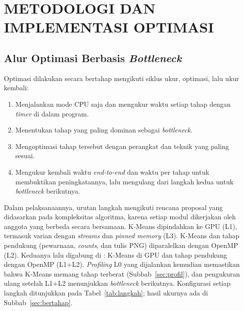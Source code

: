 \chapter{METODOLOGI DAN IMPLEMENTASI OPTIMASI}

\section{Alur Optimasi Berbasis \emph{Bottleneck}}
\label{sec:alur}
Optimasi dilakukan secara bertahap mengikuti siklus ukur, optimasi, lalu ukur kembali:
\begin{enumerate}
    \item Menjalankan mode CPU saja dan mengukur waktu setiap tahap dengan \emph{timer} di dalam program.
    \item Menentukan tahap yang paling dominan sebagai \emph{bottleneck}.
    \item Mengoptimasi tahap tersebut dengan perangkat dan teknik yang paling sesuai.
    \item Mengukur kembali waktu \emph{end-to-end} dan waktu per tahap untuk membuktikan peningkatannya, lalu mengulang dari langkah kedua untuk \emph{bottleneck} berikutnya.
\end{enumerate}

Dalam pelaksanaannya, urutan langkah mengikuti rencana proposal yang didasarkan pada kompleksitas algoritma, karena setiap modul dikerjakan oleh anggota yang berbeda secara bersamaan. K-Means dipindahkan ke GPU (L1), termasuk varian dengan \emph{streams} dan \emph{pinned memory} (L3). K-Means dan tahap pendukung (pewarnaan, \emph{counts}, dan tulis PNG) diparalelkan dengan OpenMP (L2). Keduanya lalu digabung di : K-Means di GPU dan tahap pendukung dengan OpenMP (L1+L2). \emph{Profiling} L0 yang dijalankan kemudian memastikan bahwa K-Means memang tahap terberat (Subbab~\ref{sec:profil}), dan pengukuran ulang setelah L1+L2 menunjukkan \emph{bottleneck} berikutnya. Konfigurasi setiap langkah ditunjukkan pada Tabel~\ref{tab:langkah}; hasil ukurnya ada di Subbab~\ref{sec:bertahap}.

